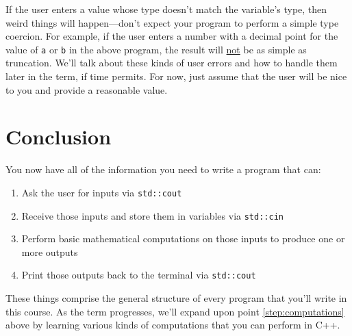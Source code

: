 \documentclass{article}
\begin{document}
If the user enters a value whose type doesn't match the variable's type, then weird things will happen---don't expect your program to perform a simple type coercion. For example, if the user enters a number with a decimal point for the value of \texttt{a} or \texttt{b} in the above program, the result will \ul{not} be as simple as truncation. We'll talk about these kinds of user errors and how to handle them later in the term, if time permits. For now, just assume that the user will be nice to you and provide a reasonable value.

\section{Conclusion}

You now have all of the information you need to write a program that can:
\begin{enumerate}
    \item Ask the user for inputs via \texttt{std::cout}
    \item Receive those inputs and store them in variables via \texttt{std::cin}
    \item \label{step:computations} Perform basic mathematical computations on those inputs to produce one or more outputs
    \item Print those outputs back to the terminal via \texttt{std::cout}
\end{enumerate}

These things comprise the general structure of every program that you'll write in this course. As the term progresses, we'll expand upon point \ref{step:computations} above by learning various kinds of computations that you can perform in C++.
\end{document}
